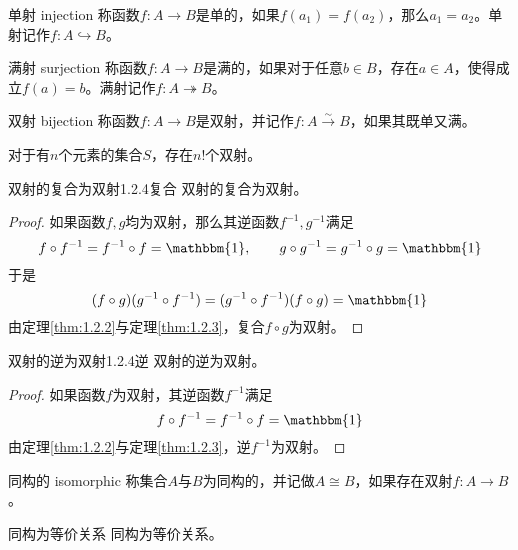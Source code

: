 \begin{definition}{单射 injection}
	称函数$f:A\to B$是单的，如果$f(a_1)=f(a_2)$，那么$a_1=a_2$。单射记作$f:A\hookrightarrow B$。
\end{definition}

\begin{definition}{满射 surjection}
	称函数$f:A\to B$是满的，如果对于任意$b\in B$，存在$a\in A$，使得成立$f(a)=b$。满射记作$f:A\twoheadrightarrow B$。
\end{definition}

\begin{definition}{双射 bijection}
	称函数$f:A\to B$是双射，并记作$f:A\xrightarrow{\sim}B$，如果其既单又满。
\end{definition}

\begin{example}
	对于有$n$个元素的集合$S$，存在$n!$个双射。
\end{example}

\begin{proposition}{双射的复合为双射}{1.2.4复合}
	双射的复合为双射。
\end{proposition}

\begin{proof}
	如果函数$f,g$均为双射，那么其逆函数$f^{-1},g^{-1}$满足
	$$
	f\circ f^{-1}=f^{-1}\circ f=\mathbbm{1},\qquad 
	g\circ g^{-1}=g^{-1}\circ g=\mathbbm{1}
	$$
	于是
	$$
	(f\circ g)(g^{-1}\circ f^{-1})=(g^{-1}\circ f^{-1})(f\circ g)=\mathbbm{1}
	$$
	由定理\ref{thm:1.2.2}与定理\ref{thm:1.2.3}，复合$f\circ g$为双射。
\end{proof}

\begin{proposition}{双射的逆为双射}{1.2.4逆}
	双射的逆为双射。
\end{proposition}

\begin{proof}
	如果函数$f$为双射，其逆函数$f^{-1}$满足
	$$
	f\circ f^{-1}=f^{-1}\circ f=\mathbbm{1}
	$$
	由定理\ref{thm:1.2.2}与定理\ref{thm:1.2.3}，逆$f^{-1}$为双射。
\end{proof}

\begin{definition}{同构的 isomorphic}
	称集合$A$与$B$为同构的，并记做$A\cong B$，如果存在双射$f:A\to B$。
\end{definition}

\begin{proposition}{同构为等价关系}
	同构为等价关系。
\end{proposition}

